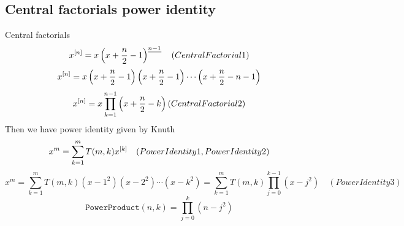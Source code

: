\subsection{Central factorials power identity}\label{subsec:central-factorials-power-identity}
Central factorials
\begin{equation*}
    x^{[n]} = x \left(x+\frac{n}{2}-1 \right)^{\underline{n-1}} \quad
    (CentralFactorial1)
\end{equation*}
\begin{equation*}
    x^{[n]} = x \left( x+\frac{n}{2}-1 \right) \left( x+\frac{n}{2}-1 \right) \cdots \left (x+\frac{n}{2}-n-1 \right)
\end{equation*}
\begin{equation*}
    x^{[n]} = x \prod_{k=1}^{n-1} \left( x+\frac{n}{2}-k \right)
    (CentralFactorial2)
\end{equation*}
Then we have power identity given by Knuth
\begin{equation*}
    x^m = \sum_{k=1}^{m} T(m, k) x^{[k]} \quad
    (PowerIdentity1, PowerIdentity2)
\end{equation*}
\begin{equation*}
    x^m = \sum_{k=1}^{m} T(m, k) (x-1^2)(x-2^2)\cdots(x-k^2) = \sum_{k=1}^{m} T(m, k) \prod_{j=0}^{k-1} (x-j^2) \quad
    (PowerIdentity3)
\end{equation*}
\begin{equation*}
    \mathtt{PowerProduct}(n, k) = \prod_{j=0}^{k} (n-j^2)
\end{equation*}